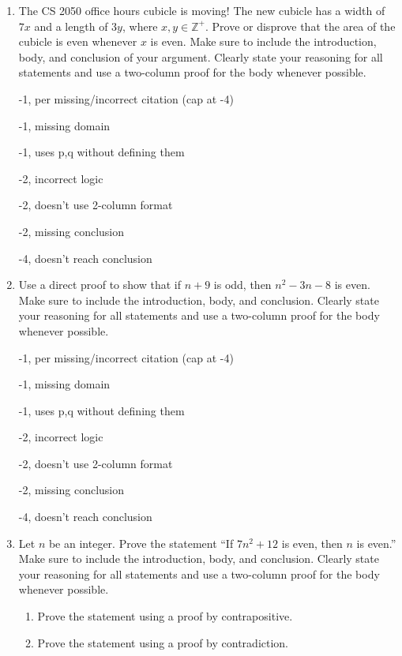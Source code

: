\begin{enumerate}
\item The CS 2050 office hours cubicle is moving! The new cubicle has a width of $7x$ and a length of $3y$, where $x, y \in \mathbb{Z}^+$. Prove or disprove that the area of the cubicle is even whenever $x$ is even. Make sure to include the introduction, body, and conclusion of your argument. Clearly state your reasoning for all statements and use a two-column proof for the body whenever possible. 

\begin{rubric}
-1, per missing/incorrect citation (cap at -4)

-1, missing domain

-1, uses p,q without defining them

-2, incorrect logic

-2, doesn't use 2-column format

-2, missing conclusion

-4, doesn't reach conclusion
\end{rubric}

\item Use a direct proof to show that if $n + 9$ is odd, then $n^2-3n-8$ is even. Make sure to include the introduction, body, and conclusion. Clearly state your reasoning for all statements and use a two-column proof for the body whenever possible. 

\begin{rubric}
-1, per missing/incorrect citation (cap at -4)

-1, missing domain

-1, uses p,q without defining them

-2, incorrect logic

-2, doesn't use 2-column format

-2, missing conclusion

-4, doesn't reach conclusion
\end{rubric}

\item Let $n$ be an integer. Prove the statement “If $7n^2 + 12$ is even, then $n$ is even.” Make sure to include the introduction, body, and conclusion. Clearly state your reasoning for all statements and use a two-column proof for the body whenever possible. 
\begin{enumerate}
    \item Prove the statement using a proof by contrapositive.
    \item Prove the statement using a proof by contradiction.
\end{enumerate}


\end{enumerate}

